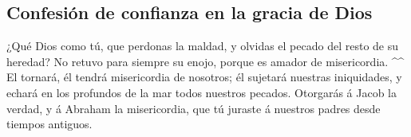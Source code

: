 \hypertarget{confesiuxf3n-de-confianza-en-la-gracia-de-dios}{%
\subsection{Confesión de confianza en la gracia de
Dios}\label{confesiuxf3n-de-confianza-en-la-gracia-de-dios}}

 ¿Qué Dios como tú, que perdonas la maldad, y olvidas el
pecado del resto de su heredad? No retuvo para siempre su enojo, porque
es amador de misericordia. \^{}\^{}  El tornará, él tendrá
misericordia de nosotros; él sujetará nuestras iniquidades, y echará en
los profundos de la mar todos nuestros pecados.  Otorgarás
á Jacob la verdad, y á Abraham la misericordia, que tú juraste á
nuestros padres desde tiempos antiguos.
